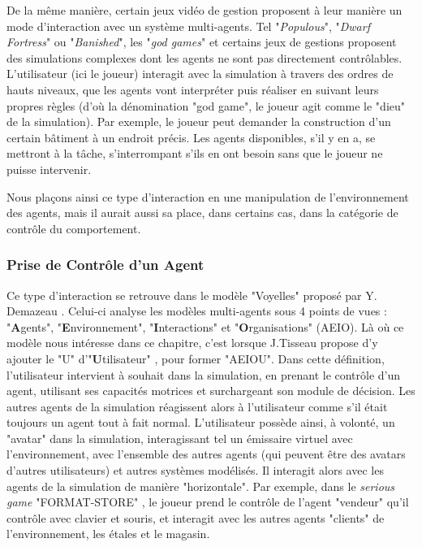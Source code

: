 		De la même manière, certain jeux vidéo de gestion proposent à leur manière un mode d'interaction avec un système multi-agents. Tel "\textit{Populous}", "\textit{Dwarf Fortress}" ou "\textit{Banished}", les "\textit{god games}" et certains jeux de gestions proposent des simulations complexes dont les agents ne sont pas directement contrôlables. L'utilisateur (ici le joueur) interagit avec la simulation à travers des ordres de hauts niveaux, que les agents vont interpréter puis réaliser en suivant leurs propres règles (d'où la dénomination "god game", le joueur agit comme le "dieu" de la simulation). Par exemple, le joueur peut demander la construction d'un certain bâtiment à un endroit précis. Les agents disponibles, s'il y en a, se mettront à la tâche, s'interrompant s'ils en ont besoin sans que le joueur ne puisse intervenir. 
		
		Nous plaçons ainsi ce type d'interaction en une manipulation de l'environnement des agents, mais il aurait aussi sa place, dans certains cas, dans la catégorie de contrôle du comportement.
	
	\subsubsection{Prise de Contrôle d'un Agent}
		Ce type d'interaction se retrouve dans le modèle "Voyelles" proposé par Y. Demazeau \cite{demazeau_interactions_1995}. Celui-ci analyse les modèles multi-agents sous 4 points de vues : "\textbf{A}gents", "\textbf{E}nvironnement", "\textbf{I}nteractions" et "\textbf{O}rganisations" (AEIO). Là où ce modèle nous intéresse dans ce chapitre, c'est lorsque J.Tisseau propose d'y ajouter le "U" d'"\textbf{U}tilisateur" \cite{tisseau_realite_2001}, pour former "AEIOU". Dans cette définition, l'utilisateur intervient à souhait dans la simulation, en prenant le contrôle d'un agent, utilisant ses capacités motrices et surchargeant son module de décision. Les autres agents de la simulation réagissent alors à l'utilisateur comme s'il était toujours un agent tout à fait normal. 
		L'utilisateur possède ainsi, à volonté, un "avatar" dans la simulation, interagissant tel un émissaire virtuel avec l'environnement, avec l'ensemble des autres agents (qui peuvent être des avatars d'autres utilisateurs) et autres systèmes modélisés. Il interagit alors avec les agents de la simulation de manière "horizontale". Par exemple, dans le \textit{serious game} "FORMAT-STORE" \cite{mathieu_serious_2011}, le joueur prend le contrôle de l'agent "vendeur" qu'il contrôle avec clavier et souris, et interagit avec les autres agents "clients" de l'environnement, les étales et le magasin.
		
